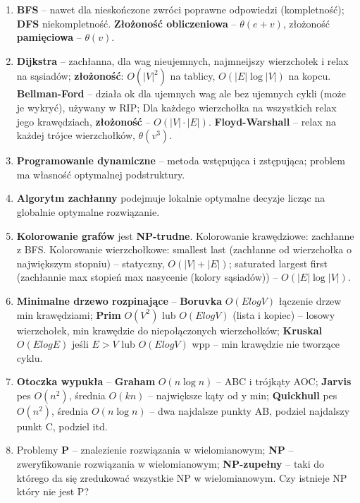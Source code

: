\documentclass[12pt]{article}
\begin{document}
\begin{enumerate}
        \item \textbf{BFS} -- nawet dla nieskończone zwróci poprawne odpowiedzi (kompletność); \textbf{DFS} niekompletność.
        \textbf{Złożoność obliczeniowa} -- $\theta(e + v)$, złożoność \textbf{pamięciowa} --  $\theta(v)$.

        \item \textbf{Dijkstra} -- zachłanna, dla wag nieujemnych, najmneijszy wierzchołek i relax na sąsiadów;
        \textbf{złożoność}: $O(|V|^2)$ na tablicy, $O(|E|\log|V|)$ na kopcu.
        \textbf{Bellman-Ford} -- działa ok dla ujemnych wag ale bez ujemnych cykli (może je wykryć), używany w RIP;
        Dla każdego wierzchołka na wszystkich relax jego krawędziach, \textbf{złożoność} -- $O(|V|\cdot|E|)$.
        \textbf{Floyd-Warshall} -- relax na każdej trójce wierzchołków, $\theta(v^3)$.

        \item \textbf{Programowanie dynamiczne} -- metoda wstępująca i zstępująca;
        problem ma własność optymalnej
        podstruktury.

        \item \textbf{Algorytm zachłanny} podejmuje lokalnie optymalne decyzje licząc na globalnie optymalne rozwiązanie.

        \item  \textbf{Kolorowanie grafów} jest \textbf{NP-trudne}.
        Kolorowanie krawędziowe: zachłanne z BFS\@.
        Kolorowanie wierzchołkowe: smallest last (zachłanne od wierzchołka o największym stopniu) -- statyczny, $O(|V|+|E|)$;
        saturated largest first (zachłannie max stopień max nasycenie (kolory sąsiadów)) -- $O(|E|\log |V|)$.

        \item \textbf{Minimalne drzewo rozpinające} -- \textbf{Boruvka} $O(ElogV)$ łączenie drzew min krawędziami;
        \textbf{Prim} $O(V^2)$ lub $O(ElogV)$ (lista i kopiec) -- losowy wierzchołek, min krawędzie do niepołączonych
        wierzchołków; \textbf{Kruskal}  $O(ElogE)$ jeśli $E > V$ lub $O(ElogV)$ wpp -- min krawędzie nie tworzące cyklu.

        \item \textbf{Otoczka wypukła} -- \textbf{Graham}  $O(n \log n)$ -- ABC i trójkąty AOC; \textbf{Jarvis}
        pes $O(n^2)$, średnia $O(kn)$ -- największe kąty od y min; \textbf{Quickhull} pes $O(n^2)$, średnia
        $O(n \log n)$ -- dwa najdalsze punkty AB, podziel najdalszy punkt C, podziel itd.

        \item Problemy \textbf{P} -- znalezienie rozwiązania w wielomianowym; \textbf{NP} -- zweryfikowanie rozwiązania
        w wielomianowym; \textbf{NP-zupełny} -- taki do którego da się zredukować wszystkie NP w wielomianowym.
        Czy istnieje NP który nie jest P?


\end{enumerate}
\end{document}
